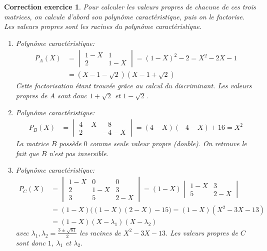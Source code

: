 \documentclass[12pt]{article}
\newtheorem{correction}{\bf Correction exercice}
\newenvironment{cor}{
\begin{correction}\smallskip\normalfont}{\end{correction}
}
\begin{document}
\begin{cor} Pour calculer les valeurs propres de chacune de ces trois matrices,
  on calcule d'abord son polynôme caractéristique, puis on le factorise.
  Les valeurs propres sont les racines du polynôme caractéristique.
  \begin{enumerate}
  \item
    Polynôme caractéristique:
    \begin{align*}
      P_A(X)
      &=
      \begin{vmatrix}
        1-X & 1
        \\
        2 & 1-X
      \end{vmatrix}
      = (1-X)^2 - 2
      = X^2 - 2X - 1
      \\
      &= (X-1-\sqrt{2})(X-1+\sqrt{2})
    \end{align*}
    Cette factorisation étant trouvée gr\^ace au calcul du discriminant.
    Les valeurs propres de $A$ sont donc
    $1+\sqrt{2}$ et $1-\sqrt{2}$.

  \item Polynôme caractéristique:
    \begin{align*}
      P_B(X)
      &=
      \begin{vmatrix}
        4-X & -8
        \\
        2 & -4-X
      \end{vmatrix}
      = (4-X)(-4-X) + 16
      = X^2
    \end{align*}
    La matrice $B$ possède $0$ comme seule valeur propre (double).
    On retrouve le fait que $B$ n'est pas inversible.

  \item Polynôme caractéristique:
    \begin{align*}
      P_C(X)
      &=
      \begin{vmatrix}
        1-X & 0 & 0
        \\
        2 & 1-X & 3
        \\
        3 & 5 & 2-X
      \end{vmatrix}
      = (1-X)
      \begin{vmatrix}
        1-X & 3
        \\
        5 & 2-X
      \end{vmatrix}
      \\
      &= (1-X) \Big( (1-X)(2-X)-15 \Big)
       = (1-X) (X^2-3X-13)
      \\
      &= (1-X) (X-\lambda_1) (X-\lambda_2)
    \end{align*}
    avec $\lambda_1 , \lambda_2 = \frac{3 \pm \sqrt{61}}{2}$
    les racines de $X^2-3X-13$.
    Les valeurs propres de $C$ sont donc $1$, $\lambda_1$ et $\lambda_2$.
  \end{enumerate}
    \end{cor}
\color{black}
\fi
\end{document}
